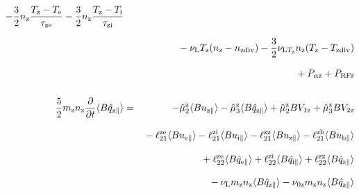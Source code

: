 \documentclass[11pt]{article}
\def\r#1{{\rm#1}}
\def\aves#1{\langle#1\rangle}
\def\para{\parallel}
\def\ddt{\frac{\partial}{\partial t}}
\def\mz{m_\r{z}}
\def\nz{n_\r{z}}
\def\Te{T_\r{e}}
\def\Ti{T_\r{i}}
\def\Tz{T_\r{z}}
\def\upara#1{u_{\r{#1}\para}}
\def\qhatpara#1{\hat{q}_{\r{#1}\para}}
\def\nun#1{\nu_\r{0#1}}
\def\ndiv#1{n_\r{#1div}}
\def\Tdiv#1{T_\r{#1div}}
\def\nuLT#1{\nu_{\r{L}T_\r{#1}}}
\def\PRF#1{P_\r{RF#1}}
\def\Palp#1{P_{\alpha\r{#1}}}
\def\nuL{\nu_\r{L}}
\begin{document}
\begin{eqnarray}
%
  - \frac{3}{2} \nz \frac{ \Tz - \Te }{\tau_\r{ze}}
  - \frac{3}{2} \nz \frac{ \Tz - \Ti }{\tau_\r{zi}}
\nonumber\\[2.5mm]&&{}
%
  - \nuL \Tz (\nz - \ndiv{z})
%
  - \frac{3}{2} \nuLT{z} \nz (\Tz - \Tdiv{z})
\nonumber\\[2.5mm]&&{}
%
  + \Palp{z}
%
  + \PRF{z}
\\[5mm]
 \frac{5}{2} \mz \nz \ddt \aves{B \qhatpara{z}} &=&
%
  - \hat{\mu}_2^\r{z} \aves{B \upara{z}} 
  - \hat{\mu}_3^\r{z} \aves{B \qhatpara{z}}
%
  + \hat{\mu}_2^\r{z} {B V_{1\r{z}}} 
  + \hat{\mu}_3^\r{z} {B V_{2\r{z}}}
\nonumber\\[3mm]&&{}
%
  - \ell_{21}^{\r{ze}} \aves{B \upara{e}}
  - \ell_{21}^{\r{zi}} \aves{B \upara{i}}
  - \ell_{21}^{\r{zz}} \aves{B \upara{z}}
  - \ell_{21}^{\r{zb}} \aves{B \upara{b}}
\nonumber\\[3mm]&&{}
%
  + \ell_{22}^{\r{ze}} \aves{B \qhatpara{e}}
  + \ell_{22}^{\r{zi}} \aves{B \qhatpara{i}}
  + \ell_{22}^{\r{zz}} \aves{B \qhatpara{z}}
\nonumber\\[3mm]&&{}
%
  - \nuL \mz \nz \aves{B \qhatpara{z}}
%
  - \nun{z} \mz \nz \aves{B \qhatpara{z}}
\end{eqnarray}
%
\end{document}
